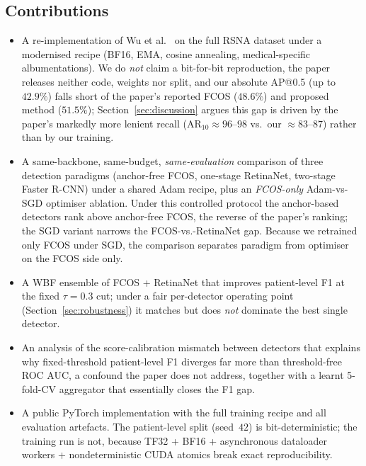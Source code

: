 \documentclass[11pt,a4paper]{article}
\begin{document}
\subsection*{Contributions}
\begin{itemize}[nosep]
    \item A re-implementation of Wu et al.~\cite{wu2024pneumonia} on the full RSNA dataset under a modernised recipe (BF16, EMA, cosine annealing, medical-specific albumentations). We do \emph{not} claim a bit-for-bit reproduction, the paper releases neither code, weights nor split, and our absolute AP@0.5 (up to $42.9\%$) falls short of the paper's reported FCOS ($48.6\%$) and proposed method ($51.5\%$); Section~\ref{sec:discussion} argues this gap is driven by the paper's markedly more lenient recall (AR$_{10}\!\approx\!96$--$98$ vs.\ our $\approx\!83$--$87$) rather than by our training.
    \item A same-backbone, same-budget, \emph{same-evaluation} comparison of three detection paradigms (anchor-free FCOS, one-stage RetinaNet, two-stage Faster R-CNN) under a shared Adam recipe, plus an \emph{FCOS-only} Adam-vs-SGD optimiser ablation. Under this controlled protocol the anchor-based detectors rank above anchor-free FCOS, the reverse of the paper's ranking; the SGD variant narrows the FCOS-vs.-RetinaNet gap. Because we retrained only FCOS under SGD, the comparison separates paradigm from optimiser on the FCOS side only.
    \item A WBF ensemble of FCOS + RetinaNet that improves patient-level F1 at the fixed $\tau=0.3$ cut; under a fair per-detector operating point (Section~\ref{sec:robustness}) it matches but does \emph{not} dominate the best single detector.
    \item An analysis of the score-calibration mismatch between detectors that explains why fixed-threshold patient-level F1 diverges far more than threshold-free ROC AUC, a confound the paper does not address, together with a learnt 5-fold-CV aggregator that essentially closes the F1 gap.
    \item A public PyTorch implementation with the full training recipe and all evaluation artefacts. The patient-level split (seed~$42$) is bit-deterministic; the training run is not, because TF32 + BF16 + asynchronous dataloader workers + nondeterministic CUDA atomics break exact reproducibility.
\end{itemize}
\end{document}
